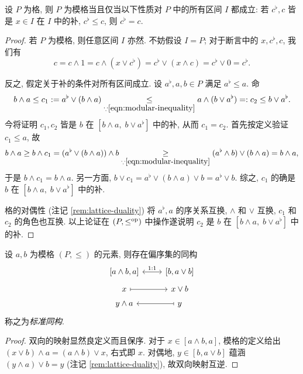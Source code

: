 \begin{lemma}\label{prop:modularity-criterion}
	设 $P$ 为格, 则 $P$ 为模格当且仅当以下性质对 $P$ 中的所有区间 $I$ 都成立: 若 $c^\flat, c$ 皆是 $x \in I$ 在 $I$ 中的补, $c^\flat \leq c$, 则 $c^\flat = c$.
\end{lemma}
\begin{proof}
	若 $P$ 为模格, 则任意区间 $I$ 亦然. 不妨假设 $I=P$; 对于断言中的 $x, c^\flat, c$, 我们有
	\[ c = c \wedge 1 = c \wedge (x \vee c^\flat) = c^\flat \vee (x \wedge c) = c^\flat \vee 0 = c^\flat . \]
	
	反之, 假定关于补的条件对所有区间成立. 设 $a^\flat, a, b \in P$ 满足 $a^\flat \leq a$. 命
	\[ b \wedge a \leq c_1 := a^\flat \vee (b \wedge a) \underset{\because \eqref{eqn:modular-inequality}}{\leq} a \wedge (b \vee a^\flat) =: c_2 \leq b \vee a^\flat. \]
	今将证明 $c_1, c_2$ 皆是 $b$ 在 $\left[ b \wedge a, \; b \vee a^\flat \right]$ 中的补, 从而 $c_1 = c_2$. 首先按定义验证 $c_1 \leq a$, 故
	\[ b \wedge a \geq b \wedge c_1 = (a^\flat \vee (b \wedge a)) \wedge b \underset{\because \eqref{eqn:modular-inequality}}{\geq} (a^\flat \wedge b) \vee (b \wedge a) = b \wedge a , \]
	于是 $b \wedge c_1 = b \wedge a$. 另一方面, $b \vee c_1 = a^\flat \vee (b \wedge a) \vee b = a^\flat \vee b$. 综之, $c_1$ 的确是 $b$ 在 $\left[ b \wedge a, \; b \vee a^\flat \right]$ 中的补.

	格的对偶性 (注记 \ref{rem:lattice-duality}) 将 $a^\flat, a$ 的序关系互换, $\wedge$ 和 $\vee$ 互换, $c_1$ 和 $c_2$ 的角色也互换. 以上论证在 $(P, \leq^{\operatorname{op}})$ 中操作遂说明 $c_2$ 是 $b$ 在 $\left[ b \wedge a, \; b \vee a^\flat \right]$ 中的补.
\end{proof}

\begin{proposition}\label{prop:lattice-diamond-isom}
	设 $a, b$ 为模格 $(P, \leq)$ 的元素, 则存在偏序集的同构
	\[\begin{tikzcd}[row sep=tiny]
		{[a \wedge b, a]} \arrow[leftrightarrow, r, "1:1"] & {[b, a \vee b]} \\
		x \arrow[mapsto, r] & x \vee b \\
		y \wedge a & y \arrow[mapsto, l]
	\end{tikzcd}\]
	称之为\emph{标准同构}.
\end{proposition}
\begin{proof}
	双向的映射显然良定义而且保序. 对于 $x \in [a \wedge b, a]$, 模格的定义给出 $(x \vee b) \wedge a = (a \wedge b) \vee x$, 右式即 $x$. 对偶地, $y \in [b, a \vee b]$ 蕴涵 $(y \wedge a) \vee b = y$ (注记 \ref{rem:lattice-duality}), 故双向映射互逆.
\end{proof}

